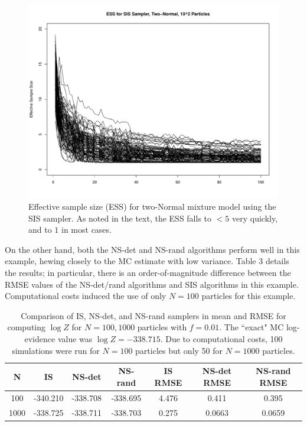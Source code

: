 \documentclass[psamsfonts]{amsart}
\begin{document}
\begin{figure}
\includegraphics[width=\textwidth]{Mix_10e2_f01_ESS.pdf}
\caption{Effective sample size (ESS) for two-Normal mixture model using the SIS sampler. As noted in the text, the ESS falls to $< 5$ very quickly, and to $1$ in most cases.}
\end{figure}

On the other hand, both the NS-det and NS-rand algorithms perform well in this example, hewing closely to the MC estimate with low variance. {\sc Table 3} details the results; in particular, there is an order-of-magnitude difference between the RMSE values of the NS-det/rand algorithms and SIS algorithms in this example. Computational costs induced the use of only $N = 100$ particles for this example.

\begin{table}[b]\centering
\caption{Comparison of IS, NS-det, and NS-rand samplers in mean and RMSE for computing $\log Z$ for $N = 100, 1000$ particles with $f = 0.01$. The ``exact" MC log-evidence value was $\log Z = -338.715$. Due to computational costs, 100 simulations were run for $N = 100$ particles but only 50 for $N = 1000$ particles.}
\begin{tabular}{c|c|c|c|c|c|c}
N & IS & NS-det & NS-rand & IS RMSE & NS-det RMSE & NS-rand RMSE \\\hline
100 & -340.210 & -338.708 & -338.695 & 4.476 & 0.411 & 0.395\\
1000 & -338.725 &  -338.711 & -338.703 & 0.275 & 0.0663 & 0.0659\\ 

\end{tabular}\\
\end{table}
\end{document}
